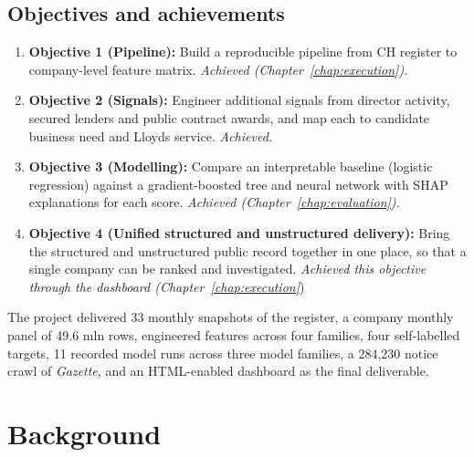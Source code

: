 \documentclass[    author={Samuel Menon Demelo; Sneha Saphala Ram Prasad; 
Viktor Ander Lindholm; Vishal Khatri},
               supervisor={Prof. Fernando Moreno-Pino},
                   degree={MSc},
                    title={Lloyds Commercial Banking Intelligence},
                 subtitle={Ranking SME Lending, Risk and Growth Prospects for Lloyds Banking Group},
                     type={},
                     year={2026}]{dissertation}
\begin{document}
\section{Objectives and achievements}

\begin{enumerate}
    \item \textbf{Objective 1 (Pipeline):} Build a reproducible pipeline from CH register to company-level feature matrix. \emph{Achieved (Chapter~\ref{chap:execution}).}

    \item \textbf{Objective 2 (Signals):} Engineer additional signals from director activity, secured lenders and public contract awards, and map each to candidate business need and Lloyds service. \emph{Achieved.}

    \item \textbf{Objective 3 (Modelling):} Compare an interpretable baseline (logistic regression) against a gradient-boosted tree and neural network with SHAP explanations for each score. \emph{Achieved (Chapter~\ref{chap:evaluation}).}
\item \textbf{Objective 4 (Unified structured and unstructured delivery):}
    Bring the structured and unstructured public record together in one place, so that a single company can be ranked and investigated. \emph{Achieved this objective through the dashboard (Chapter~\ref{chap:execution}})
\end{enumerate}

\noindent
The project delivered 33 monthly snapshots of the register, a company monthly panel of 49.6 mln rows, engineered features across four families, four self-labelled targets, 11 recorded model runs across three model families, a 284,230 notice crawl of \emph{Gazette}, and an HTML-enabled dashboard as the final deliverable.

\chapter{Background}
\label{chap:background}
\end{document}
